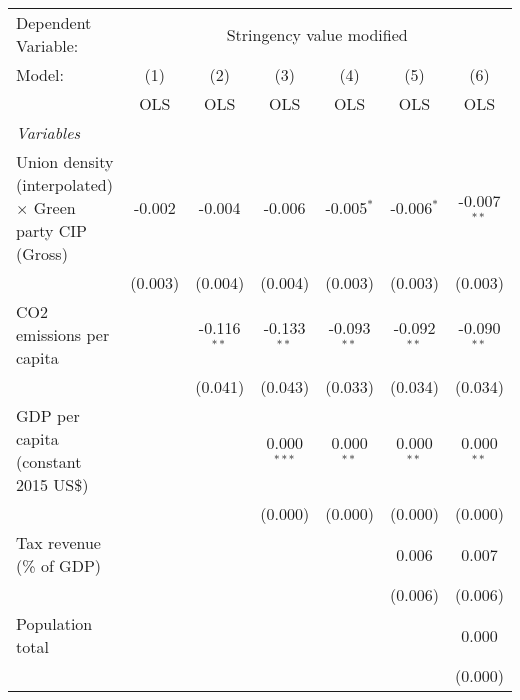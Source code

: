 
\begingroup
\centering
\begin{tabular}{lcccccc}
   \toprule
   Dependent Variable: & \multicolumn{6}{c}{Stringency value modified}\\
   Model:                                                         & (1)     & (2)           & (3)           & (4)           & (5)           & (6)\\  
                                                                  &  OLS    & OLS           & OLS           & OLS           & OLS           & OLS\\  
   \midrule
   \emph{Variables}\\
   Union density (interpolated) $\times$ Green party CIP (Gross)  & -0.002  & -0.004        & -0.006        & -0.005$^{*}$  & -0.006$^{*}$  & -0.007$^{**}$\\   
                                                                  & (0.003) & (0.004)       & (0.004)       & (0.003)       & (0.003)       & (0.003)\\   
   CO2 emissions per capita                                       &         & -0.116$^{**}$ & -0.133$^{**}$ & -0.093$^{**}$ & -0.092$^{**}$ & -0.090$^{**}$\\   
                                                                  &         & (0.041)       & (0.043)       & (0.033)       & (0.034)       & (0.034)\\   
   GDP per capita (constant 2015 US\$)                            &         &               & 0.000$^{***}$ & 0.000$^{**}$  & 0.000$^{**}$  & 0.000$^{**}$\\   
                                                                  &         &               & (0.000)       & (0.000)       & (0.000)       & (0.000)\\   
   Tax revenue (\% of GDP)                                        &         &               &               &               & 0.006         & 0.007\\   
                                                                  &         &               &               &               & (0.006)       & (0.006)\\   
   Population total                                               &         &               &               &               &               & 0.000\\   
                                                                  &         &               &               &               &               & (0.000)\\   

\end{tabular}
